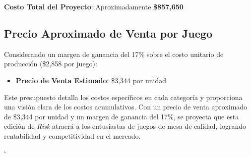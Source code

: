 \documentclass[12pt]{article}
\begin{document}
\textbf{Costo Total del Proyecto}: Aproximadamente \textbf{\$857,650}

\subsection*{Precio Aproximado de Venta por Juego}
Considerando un margen de ganancia del 17\% sobre el costo unitario de producción (\$2,858 por juego):

\begin{itemize}
    \item \textbf{Precio de Venta Estimado}: \$3,344 por unidad
\end{itemize}


Este presupuesto detalla los costos específicos en cada categoría y proporciona una visión clara de los costos acumulativos. Con un precio de venta aproximado de \$3,344 por unidad y un margen de ganancia del 17\%, se proyecta que esta edición de \textit{Risk} atraerá a los entusiastas de juegos de mesa de calidad, logrando rentabilidad y competitividad en el mercado.


`
\end{document}
